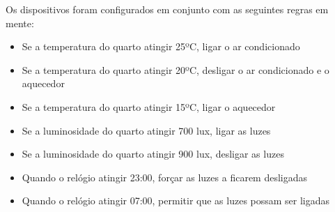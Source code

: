 \noindent
Os dispositivos foram configurados em conjunto com as seguintes regras em mente:
\begin{itemize}
  \item Se a temperatura do quarto atingir 25ºC, ligar o ar condicionado
  \item Se a temperatura do quarto atingir 20ºC, desligar o ar condicionado e o aquecedor
  \item Se a temperatura do quarto atingir 15ºC, ligar o aquecedor
\end{itemize}

\begin{itemize}
  \item Se a luminosidade do quarto atingir 700 lux, ligar as luzes
  \item Se a luminosidade do quarto atingir 900 lux, desligar as luzes
\end{itemize}

\begin{itemize}
  \item Quando o relógio atingir 23:00, forçar as luzes a ficarem desligadas
  \item Quando o relógio atingir 07:00, permitir que as luzes possam ser ligadas
\end{itemize}